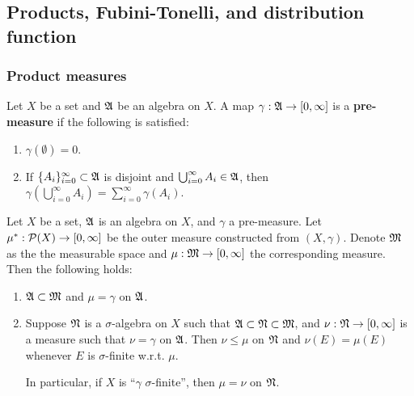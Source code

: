 \documentclass[a4paper]{article}
\renewcommand{\cupinfi}{\bigcup_{i=0}^\infty}
\renewcommand{\suminfi}{\sum_{i=0}^\infty}
\renewcommand{\seqinfi}[1]{\{ #1 \}_{i=0}^\infty}
\begin{document}
\subsection{Products, Fubini-Tonelli, and distribution
  function}

\subsubsection{Product measures}

\begin{defi}
  Let $X$ be a set and $\mathfrak{A}$ be an algebra on $X$. A map
  $\gamma: \mathfrak{A} \to [0, \infty]$ is a \textbf{pre-measure}
  if the following is satisfied:
  \begin{enumerate}
    \item $\gamma(\emptyset) = 0$.
    \item If $\seqinfi{A_i} \subset \afk$ is disjoint and $\cupinfi A_i
          \in \afk$, then $\gamma \left( \cupinfi A_i \right) = \suminfi
          \gamma(A_i)$.
  \end{enumerate}

\end{defi}

\begin{thm}
  Let $X$ be a set, $\mathfrak{A}$ is an algebra on $X$, and
  $\gamma$ a pre-measure. Let $\mu^* : \mathcal{P} (X) \to [0, \infty]$
  be the outer measure constructed from $(X, \gamma)$.
  Denote $\mathfrak{M}$ as the the measurable space and
  $\mu: \mathfrak{M} \to [0, \infty]$ the corresponding measure.
  Then the following holds:
  \begin{enumerate}
    \item $\mathfrak{A} \subset \mathfrak{M}$ and $\mu = \gamma$ on $\mathfrak{A}$.

    \item Suppose $\mathfrak{N}$ is a $\sigma$-algebra on $X$ such that $\mathfrak{A}
          \subset \mathfrak{N} \subset \mathfrak{M}$, and $\nu: \mathfrak{N} \to [0, \infty]$ is a
          measure such that $\nu = \gamma$ on $\mathfrak{A}$. Then $\nu \leq \mu$
          on $\mathfrak{N}$ and $\nu(E) = \mu(E)$ whenever $E$ is $\sigma$-finite
          w.r.t. $\mu$.

          In particular, if $X$ is ``$\gamma$ $\sigma$-finite'', then $\mu
          = \nu$ on $\mathfrak{N}$.
  \end{enumerate}
\end{thm}
\end{document}
